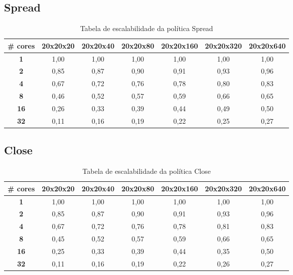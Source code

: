 \documentclass[a4paper, 12pt]{article}
\begin{document}
	\subsection{Spread}
	\begin{table}[htbp]
		\centering
		\begin{tabular}{|c|c|c|c|c|c|c|}
			\hline
			\textbf{\# cores} & \textbf{20x20x20} & \textbf{20x20x40} & \textbf{20x20x80} & \textbf{20x20x160} & \textbf{20x20x320} & \textbf{20x20x640} \\
			\hline
			\textbf{1} & 1,00 & 1,00 & 1,00 & 1,00 & 1,00 & 1,00 \\
			\hline
			\textbf{2} & 0,85 & 0,87 & 0,90 & 0,91 & 0,93 & 0,96 \\
			\hline
			\textbf{4} & 0,67 & 0,72 & 0,76 & 0,78 & 0,80 & 0,83 \\
			\hline
			\textbf{8} & 0,46 & 0,52 & 0,57 & 0,59 & 0,66 & 0,65 \\
			\hline
			\textbf{16} & 0,26 & 0,33 & 0,39 & 0,44 & 0,49 & 0,50 \\
			\hline
			\textbf{32} & 0,11 & 0,16 & 0,19 & 0,22 & 0,25 & 0,27 \\
			\hline
		\end{tabular}
		\caption{Tabela de escalabilidade da política Spread}
	\end{table}
	
	\FloatBarrier
	
	\subsection{Close}
	\begin{table}[htbp]
		\centering
		\begin{tabular}{|c|c|c|c|c|c|c|}
			\hline
			\textbf{\# cores} & \textbf{20x20x20} & \textbf{20x20x40} & \textbf{20x20x80} & \textbf{20x20x160} & \textbf{20x20x320} & \textbf{20x20x640} \\
			\hline
			\textbf{1} & 1,00 & 1,00 & 1,00 & 1,00 & 1,00 & 1,00 \\
			\hline
			\textbf{2} & 0,85 & 0,87 & 0,90 & 0,91 & 0,93 & 0,96 \\
			\hline
			\textbf{4} & 0,67 & 0,72 & 0,76 & 0,78 & 0,81 & 0,83 \\
			\hline
			\textbf{8} & 0,45 & 0,52 & 0,57 & 0,59 & 0,66 & 0,65 \\
			\hline
			\textbf{16} & 0,25 & 0,33 & 0,39 & 0,44 & 0,35 & 0,50 \\
			\hline
			\textbf{32} & 0,11 & 0,16 & 0,19 & 0,22 & 0,26 & 0,27 \\
			\hline
		\end{tabular}
		\caption{Tabela de escalabilidade da política Close}
	\end{table}
	
\end{document}
